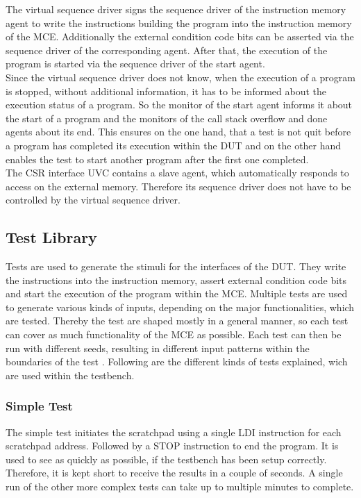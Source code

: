 The virtual sequence driver signs the sequence driver of the instruction memory agent to write the instructions building the program into the instruction memory
of the MCE.
Additionally the external condition code bits can be asserted via the sequence driver of the corresponding agent.
After that, the execution of the program is started via the sequence driver of the start agent.\\
Since the virtual sequence driver does not know, when the execution of a program is stopped, without additional information, it has to be informed about the
execution status of a program.
So the monitor of the start agent informs it about the start of a program and the monitors of the call stack overflow and done agents about its end.
This ensures on the one hand, that a test is not quit before a program has completed its execution within the DUT and on the other hand enables the test to
start another program after the first one completed.\\
The CSR interface UVC contains a slave agent, which automatically responds to access on the external memory.
Therefore its sequence driver does not have to be controlled by the virtual sequence driver.

\subsection{Test Library}

Tests are used to generate the stimuli for the interfaces of the DUT. They write the instructions into the instruction memory, assert external condition code
bits and start the execution of the program within the MCE. Multiple tests are used to generate various kinds of inputs, depending on the major functionalities,
which are tested. Thereby the test are shaped mostly in  a general manner, so each test can cover as much functionality of the MCE as possible. Each test can
then be run with different seeds, resulting in different input patterns within the boundaries of the test \cite{sv_verification}.
Following are the different kinds of tests explained, wich are used within the testbench.

\subsubsection{Simple Test}

The simple test initiates the scratchpad using a single LDI instruction for each scratchpad address. 
Followed by a STOP instruction to end the program.
It is used to see as quickly as possible, if the testbench has been setup correctly.
Therefore, it is kept short to receive the results in a couple of seconds.
A single run of the other more complex tests can take up to multiple minutes to complete.

